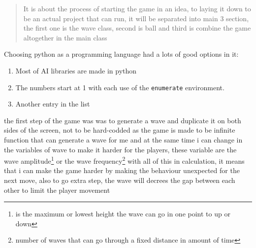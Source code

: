 \begin{abstract}
	It is about the process of starting the game in an idea, to laying it down to be an actual project that can run, it will be separated into main 3 section, the first one is the wave class, second is ball and third is combine the game altogether in the main class
\end{abstract}

Choosing python as a programming language had a lots of good options in it:

\begin{enumerate}
	\item Most of AI libraries are made in python
	\item The numbers start at 1 with each use of the \texttt{enumerate} environment.
	\item Another entry in the list
\end{enumerate}


the first step of the game was was to generate a wave and duplicate it on both sides of the screen, not to be hard-codded as the game is made to be infinite function that can generate a wave for me and at the same time i can change in the variables of  wave to make it harder for the players, these variable are 
the wave amplitude\footnote{is the maximum or lowest height the wave can go in one point to up or down} or 
the wave frequency\footnote{ number of waves that can go through a fixed distance in amount of time} 
with all of this in calculation, it means that i can make the game harder by making the behaviour unexpected for the next move, also to go extra step, the wave will decrees the gap between each other to limit the player movement 


